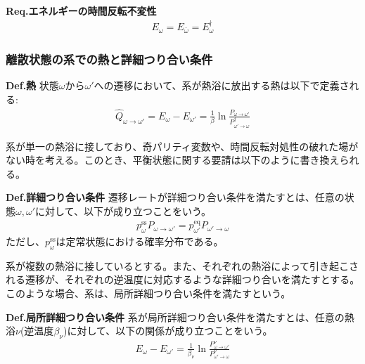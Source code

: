 \documentclass[a4paper,11pt]{jsarticle}
\numberwithin{equation}{section}
\begin{document}
\begin{itembox}[l]{\textbf{Req.エネルギーの時間反転不変性}}
    \begin{align}
        E_{\omega} = E_{\bar{\omega}} = E_{\omega}^{\dagger}
      \end{align}
\end{itembox}

\subsubsection{離散状態の系での熱と詳細つり合い条件}
\begin{itembox}[l]{\textbf{Def.熱}}
    状態$\omega$から$\omega'$への遷移において、系が熱浴に放出する熱は以下で定義される:
    \begin{align}
      \hat{Q}_{\omega \to \omega'} = E_{\omega} - E_{\omega'} = \frac{1}{\beta}\ln \frac{P_{\omega \to \omega'}}{P_{\omega' \to \omega}^{\dagger}}
    \end{align}
  \end{itembox}
  
系が単一の熱浴に接しており、奇パリティ変数や、時間反転対処性の破れた場がない時を考える。このとき、平衡状態に関する要請は以下のように書き換えられる。
\begin{itembox}[l]{\textbf{Def.詳細つり合い条件}}
    遷移レートが詳細つり合い条件を満たすとは、任意の状態$\omega,\omega'$に対して、以下が成り立つことをいう。
    \begin{align}
      p_{\omega}^{\text{ss}} P_{\omega \to \omega'} = p_{\omega'}^{\text{eq}} P_{\omega' \to \omega}
    \end{align}
    ただし、$p_{\omega}^{\text{ss}}$は定常状態における確率分布である。
\end{itembox}

系が複数の熱浴に接しているとする。また、それぞれの熱浴によって引き起こされる遷移が、それぞれの逆温度に対応するような詳細つり合いを満たすとする。
このような場合、系は、局所詳細つり合い条件を満たすという。
\begin{itembox}[l]{\textbf{Def.局所詳細つり合い条件}}
    系が局所詳細つり合い条件を満たすとは、任意の熱浴$\nu$(逆温度$\beta_{\nu}$)に対して、以下の関係が成り立つことをいう。
    \begin{align}
      E_{\omega} - E_{\omega'} = \frac{1}{\beta_{\nu}} \ln \frac{P_{\omega \to \omega'}^{\nu}}{P_{\omega' \to \omega}^{\nu}}
    \end{align}
\end{itembox}
\end{document}
